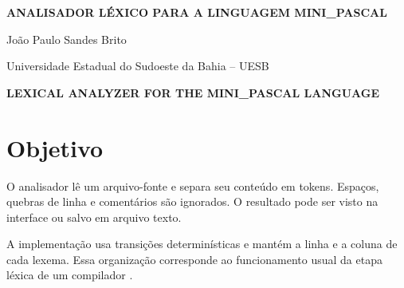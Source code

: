 \documentclass[12pt,a4paper]{article}
\begin{document}
\begin{center}
  {\bfseries\MakeUppercase{Analisador léxico para a linguagem Mini\_Pascal}}\par
  \vspace{0.8\baselineskip}
  João Paulo Sandes Brito\par
  \small Universidade Estadual do Sudoeste da Bahia -- UESB\par
\end{center}

\vspace{0.5\baselineskip}

\renewcommand{\abstractname}{Resumo}
\begin{abstract}
\noindent
O trabalho apresenta um analisador léxico para Mini\_Pascal. O programa foi escrito em Java 17, possui interface em Swing e gera pares no formato lexema--token. Foram usados seis arquivos de teste, incluindo um conjunto com erros léxicos.

\vspace{0.3\baselineskip}
\noindent\textbf{Palavras-chave}: análise léxica; Java; Mini\_Pascal.
\end{abstract}

\begin{center}
  \textbf{LEXICAL ANALYZER FOR THE MINI\_PASCAL LANGUAGE}
\end{center}

\renewcommand{\abstractname}{Abstract}
\begin{abstract}
\noindent
This paper presents a lexical analyzer for Mini\_Pascal. The program was written in Java 17, provides a Swing interface and generates lexeme--token pairs. Six input files were used for testing, including lexical errors.

\vspace{0.3\baselineskip}
\noindent\textbf{Keywords}: lexical analysis; Java; Mini\_Pascal.
\end{abstract}

\section{Objetivo}

O analisador lê um arquivo-fonte e separa seu conteúdo em tokens. Espaços, quebras de linha e comentários são ignorados. O resultado pode ser visto na interface ou salvo em arquivo texto.

A implementação usa transições determinísticas e mantém a linha e a coluna de cada lexema. Essa organização corresponde ao funcionamento usual da etapa léxica de um compilador \cite{aho2007}.
\end{document}
